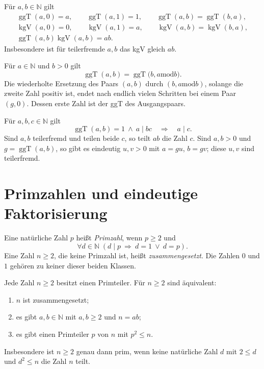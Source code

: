 \begin{theorem}
Für $a,b\in\mathbb N$ gilt
\[
\begin{gathered}
 \operatorname{ggT}(a,0)=a,\qquad
 \operatorname{ggT}(a,1)=1,\qquad
 \operatorname{ggT}(a,b)=\operatorname{ggT}(b,a),\\
 \operatorname{kgV}(a,0)=0,\qquad
 \operatorname{kgV}(a,1)=a,\qquad
 \operatorname{kgV}(a,b)=\operatorname{kgV}(b,a),\\
 \operatorname{ggT}(a,b)\operatorname{kgV}(a,b)=ab.
\end{gathered}
\]
Insbesondere ist für teilerfremde $a,b$ das kgV gleich $ab$.
\end{theorem}

\begin{theorem}
\label{b10guide:thm:euclidean}
Für $a\in\mathbb N$ und $b>0$ gilt
\[
 \operatorname{ggT}(a,b)
 =\operatorname{ggT}\bigl(b,a\mathbin{\mathrm{mod}}b\bigr).
\]
Die wiederholte Ersetzung des Paars $(a,b)$ durch
$(b,a\mathbin{\mathrm{mod}}b)$, solange die zweite Zahl positiv ist,
endet nach endlich vielen Schritten bei einem Paar $(g,0)$.
Dessen erste Zahl ist der ggT des Ausgangspaars.
\end{theorem}

\begin{theorem}
Für $a,b,c\in\mathbb N$ gilt
\[
 \operatorname{ggT}(a,b)=1\ \land\ a\mid bc
 \quad\Longrightarrow\quad a\mid c.
\]
Sind $a,b$ teilerfremd und teilen beide $c$, so teilt $ab$ die Zahl $c$.
Sind $a,b>0$ und $g=\operatorname{ggT}(a,b)$, so gibt es eindeutig
$u,v>0$ mit $a=gu$, $b=gv$; diese $u,v$ sind teilerfremd.
\end{theorem}

\section{Primzahlen und eindeutige Faktorisierung}

\begin{definition}
\label{b10guide:def:prime}
Eine natürliche Zahl $p$ heißt \emph{Primzahl}, wenn $p\ge2$ und
\[
 \forall d\in\mathbb N\;(d\mid p\ \Longrightarrow\ d=1\ \lor\ d=p).
\]
Eine Zahl $n\ge2$, die keine Primzahl ist, heißt
\emph{zusammengesetzt}. Die Zahlen $0$ und $1$ gehören zu keiner
dieser beiden Klassen.
\end{definition}

\begin{theorem}
Jede Zahl $n\ge2$ besitzt einen Primteiler. Für $n\ge2$ sind äquivalent:
\begin{enumerate}
 \item $n$ ist zusammengesetzt;
 \item es gibt $a,b\in\mathbb N$ mit $a,b\ge2$ und $n=ab$;
 \item es gibt einen Primteiler $p$ von $n$ mit $p^2\le n$.
\end{enumerate}
Insbesondere ist $n\ge2$ genau dann prim, wenn keine natürliche
Zahl $d$ mit $2\le d$ und $d^2\le n$ die Zahl $n$ teilt.
\end{theorem}


